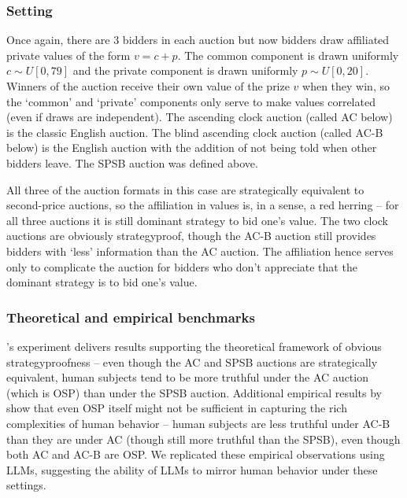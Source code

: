 \documentclass{article} %
\begin{document}
\subsubsection{Setting}
Once again, there are $3$ bidders in each auction but now bidders draw affiliated private values of the form $v = c + p$. 
The common component is drawn uniformly $c \sim U[0, 79]$ and the private component is drawn uniformly $p \sim U[0, 20]$. 
Winners of the auction receive their own value of the prize $v$ when they win, so the `common' and `private' components only serve to make values correlated (even if draws are independent). 
The ascending clock auction (called AC below) is the classic English auction. 
The blind ascending clock auction (called AC-B below) is the English auction with the addition of not being told when other bidders leave. 
The SPSB auction was defined above. 

All three of the auction formats in this case are strategically equivalent to second-price auctions, so the affiliation in values is, in a sense, a red herring -- for all three auctions it is still dominant strategy to bid one's value. 
The two clock auctions are obviously strategyproof, though the AC-B auction still provides bidders with `less' information than the AC auction. 
The affiliation hence serves only to complicate the auction for bidders who don't appreciate that the dominant strategy is to bid one's value. 

\subsubsection{Theoretical and empirical benchmarks}
\citet{li2017obviously}'s experiment delivers results supporting the theoretical framework of obvious strategyproofness -- even though the AC and SPSB auctions are strategically equivalent, human subjects tend to be more truthful under the AC auction (which is OSP) than under the SPSB auction. 
Additional empirical results by \citet{breitmoser2022obviousness} show that even OSP itself might not be sufficient in capturing the rich complexities of human behavior -- human subjects are less truthful under AC-B than they are under AC (though still more truthful than the SPSB), even though both AC and AC-B are OSP. 
We replicated these empirical observations using LLMs, suggesting the ability of LLMs to mirror human behavior under these settings.

\end{document}
